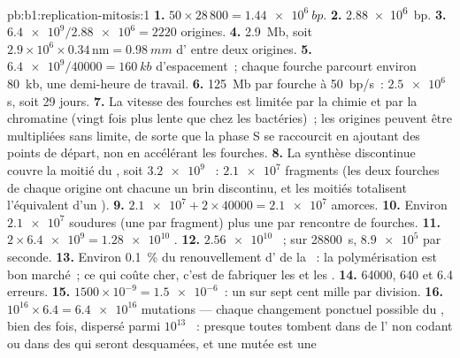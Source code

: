 \begin{solution}{pb:b1:replication-mitosis:1}
\textbf{1.} $50\times 28\,800 = \qty{1.44e6}{bp}$.
\textbf{2.} \qty{2.88e6}{bp}.
\textbf{3.} $\num{6.4e9}/\num{2.88e6} = 2220$ origines.
\textbf{4.} \qty{2.9}{Mb}, soit $2.9\times 10^6\times 0.34\,\mathrm{nm} =
\qty{0.98}{mm}$ d' entre deux origines.
\textbf{5.} $\num{6.4e9}/\num{40000} = \qty{160}{kb}$ d'espacement~;
chaque fourche parcourt environ \qty{80}{kb}, une demi-heure de travail.
\textbf{6.} \qty{125}{Mb} par fourche à \qty{50}{bp/s}~: $\num{2.5e6}$ s,
soit 29 jours.
\textbf{7.} La vitesse des fourches est limitée par la chimie et par la
chromatine (vingt fois plus lente que chez les bactéries)~; les origines
peuvent être multipliées sans limite, de sorte que la phase S se
raccourcit en ajoutant des points de départ, non en accélérant les
fourches.
\textbf{8.} La synthèse discontinue couvre la moitié du , soit
$\num{3.2e9}$ ~: $\num{2.1e7}$ fragments (les deux fourches
de chaque origine ont chacune un brin discontinu, et les moitiés
totalisent l'équivalent d'un ).
\textbf{9.} $\num{2.1e7} + 2\times\num{40000} = \num{2.1e7}$ amorces.
\textbf{10.} Environ $\num{2.1e7}$ soudures (une par fragment) plus une
par rencontre de fourches.
\textbf{11.} $2\times\num{6.4e9} = \num{1.28e10}$ .
\textbf{12.} $\num{2.56e10}$ ~; sur \qty{28800}{s}, $\num{8.9e5}$
par seconde.
\textbf{13.} Environ \qty{0.1}{\%} du renouvellement d' de la
~: la polymérisation est bon marché~; ce qui coûte cher, c'est de
fabriquer les  et les .
\textbf{14.} \num{64000}, 640 et 6.4 erreurs.
\textbf{15.} $1500\times 10^{-9} = \num{1.5e-6}$~: un  sur sept cent
mille par division.
\textbf{16.} $10^{16}\times 6.4 = \num{6.4e16}$ mutations --- chaque
changement ponctuel possible du , bien des fois, dispersé parmi
$10^{13}$ ~: presque toutes tombent dans de l' non codant ou
dans des  qui seront desquamées, et une  mutée est une

\end{solution}

